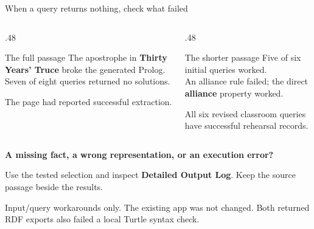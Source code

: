 \documentclass[aspectratio=169,10pt]{beamer}
\newcommand{\key}[1]{\textcolor{aegean}{\textbf{#1}}}
\newcommand{\source}[1]{\vfill{\scriptsize\color{slate}#1\par}}
\newcommand{\question}[1]{\medskip\par\key{#1}\par}
\begin{document}
\begin{frame}{When a query returns nothing, check what failed}
  \begin{columns}[T]
    \begin{column}{.48\textwidth}
      \begin{block}{The full passage}
        The apostrophe in \textbf{Thirty Years' Truce} broke the generated Prolog.\\[7pt]
        Seven of eight queries returned no solutions.
      \end{block}
      \small The page had reported successful extraction.
    \end{column}
    \begin{column}{.48\textwidth}
      \begin{block}{The shorter passage}
        Five of six initial queries worked.\\[7pt]
        An alliance rule failed; the direct \textbf{alliance} property worked.
      \end{block}
      \small All six revised classroom queries have successful rehearsal records.
    \end{column}
  \end{columns}
  \question{A missing fact, a wrong representation, or an execution error?}
  \small Use the tested selection and inspect \textbf{Detailed Output Log}. Keep the source passage beside the results.
  \source{Input/query workarounds only. The existing app was not changed. Both returned RDF exports also failed a local Turtle syntax check.}
\end{frame}
\end{document}
